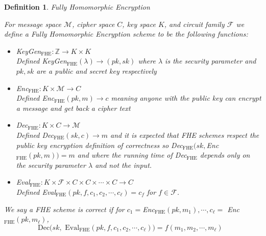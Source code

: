 \documentclass[12pt,twoside]{reedthesis}
\newtheorem{definition}{Definition}
\newcommand{\dec}[0]{\text{Dec}}
\newcommand{\Z}[0]{\mathbb{Z}}
\begin{document}
    \begin{definition}{Fully Homomorphic Encryption}
    \par For message space $\mathcal{M}$, cipher space $C$, key space $K$, and circuit family $\mathcal{F}$ we define a Fully Homomorphic Encryption scheme to be the following functions:
     
     \newcommand{\fhe}[0]{_\text{FHE}}
     
     \begin{itemize}
     \item KeyGen$_\text{FHE}:\Z \to K \times K$ \\
     Defined KeyGen$_\text{FHE}(\lambda)\to (pk,sk)$ where $\lambda$ is the security parameter and $pk,sk$ are a public and secret key respectively 
     \item Enc$_\text{FHE}:K \times \mathcal{M}\to C$ \\
     Defined Enc$_\text{FHE}(pk,m) \to c$ meaning anyone with the public key can encrypt a message and get back a cipher text
     \item Dec$_\text{FHE}:K \times C \to \mathcal{M}$ \\
     Defined Dec$_\text{FHE}(sk,c) \to m$ and it is expected that FHE schemes respect the public key encryption definition of correctness so Dec$_\text{FHE}(sk,$Enc$_\text{FHE}(pk,m))=m$ and where the running time of Dec$_\text{FHE}$ depends only on the security parameter $\lambda$ and not the input.
     \item Eval$_\text{FHE}:K \times \mathcal{F} \times C \times C \times \cdots \times C \to C$ \\
     Defined Eval$\fhe(pk,f,c_1,c_2,\cdots,c_\ell) = c_f$ for $f\in \mathcal{F}$.
    \end{itemize}
    \par We say a FHE scheme is correct if for $c_1 =$Enc$\fhe(pk,m_1), \cdots, c_\ell =$ Enc$\fhe(pk,m_\ell)$,
    $$\text{$\dec(sk,$ Eval$\fhe(pk,f,c_1,c_2, \cdots, c_\ell)) = f(m_1,m_2,\cdots,m_\ell)$ }$$ 
    \end{definition}
    
\end{document}
